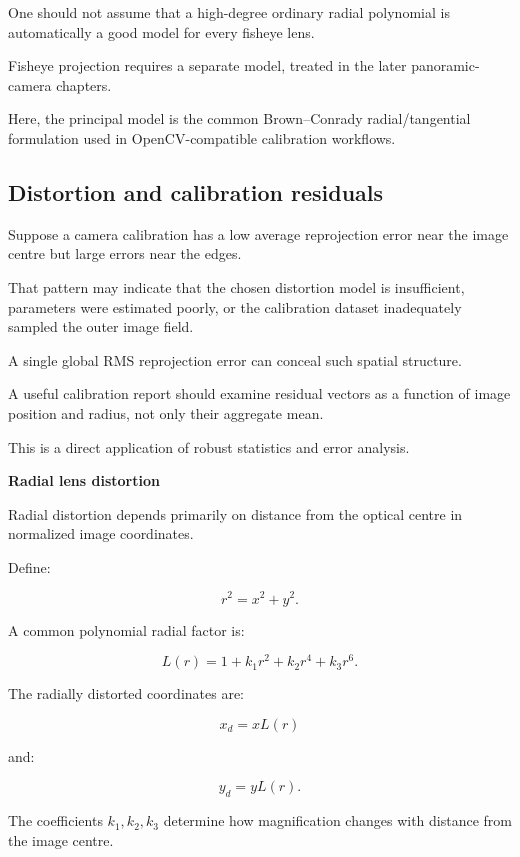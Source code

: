 One should not assume that a high-degree ordinary radial polynomial is automatically a good model for every fisheye lens.

Fisheye projection requires a separate model, treated in the later panoramic-camera chapters.

Here, the principal model is the common Brown--Conrady radial/tangential formulation used in OpenCV-compatible calibration workflows. 

\subsection{Distortion and calibration residuals}\label{02-foundations-ii-ch035-distortion-and-calibration-residuals}

\hypertarget{02-foundations-ii-ch035-distortion-and-calibration-residuals}{}

Suppose a camera calibration has a low average reprojection error near the image centre but large errors near the edges.

That pattern may indicate that the chosen distortion model is insufficient, parameters were estimated poorly, or the calibration dataset inadequately sampled the outer image field.

A single global RMS reprojection error can conceal such spatial structure.

A useful calibration report should examine residual vectors as a function of image position and radius, not only their aggregate mean.

This is a direct application of robust statistics and error analysis.

\textbf{Radial lens distortion}

Radial distortion depends primarily on distance from the optical centre in normalized image coordinates.

Define:

\[
 \boxed{ r^2=x^2+y^2 }.
\]

A common polynomial radial factor is:

\[
 \boxed{ L(r)= 1+k_1r^2+k_2r^4+k_3r^6 }.
\]

The radially distorted coordinates are:

\[
 \boxed{ x_d=xL(r) }
\]

and:

\[
 \boxed{ y_d=yL(r) }.
\]

The coefficients \(k_1,k_2,k_3\) determine how magnification changes with distance from the image centre.

